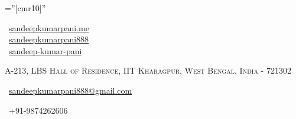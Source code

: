 \documentclass[a4paper,10pt]{article} %
\begin{document}
\pagestyle{empty} %

\font\fb=''[cmr10]'' %

\begin{multicols}{3}
\normalsize  \faGlobe\ {\href{https://sandeepkumarpani888.github.io/blog/}{sandeepkumarpani.me}}\\
\normalsize \faGithub\ {\href{https://github.com/sandeepkumarpani888}{sandeepkumarpani888}}\\
\normalsize  \faLinkedinSquare\ {\href{https://in.linkedin.com/in/sandeep-pani-3a87117b}{sandeep-kumar-pani}}\\
\columnbreak
\normalsize\par{\par} %
\par{\centering\normalsize {\textsc{A-213, LBS Hall of Residence, IIT Kharagpur, West Bengal, India - 721302}}\hfill\par}
\columnbreak
\raggedright\hfill\normalsize \faEnvelope\ {\href{mailto:sandeepkumarpani888@gmail.com}{sandeepkumarpani888@gmail.com}}\\
\raggedright\hfill{\faPhone\ +91-9874262606}
\end{multicols}



\end{document}
